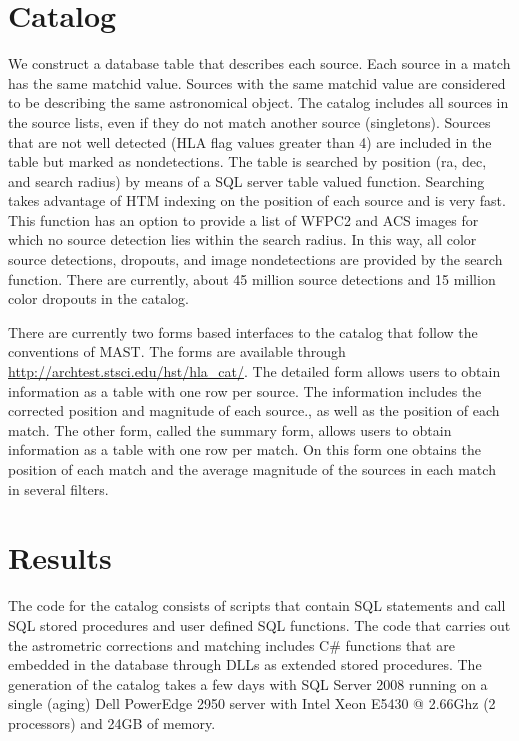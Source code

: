 \section{Catalog}
We construct a database table that describes each source. Each source in a match has the same matchid value.
Sources with the same matchid value are considered to be describing the same astronomical
object. The catalog includes all sources in the source lists, even if they do not match
another source (singletons). Sources that are not well detected (HLA flag values greater than 4)
are included in the table but marked as nondetections. The table is searched by position (ra, dec,
and search radius) by means of
a SQL server table valued function.  Searching takes advantage of HTM indexing
on the position of each source and is very fast.
This function has an option to provide a list of WFPC2 and ACS images for which no source detection
lies within the search radius. In this way, all color source detections, dropouts, and image
nondetections are provided by the search function.  There are currently, about 45 million
source detections and 15 million color dropouts in the catalog.

There are currently two forms based interfaces to the catalog that follow
the conventions of MAST. The forms are available through \url{http://archtest.stsci.edu/hst/hla_cat/}.
The detailed form allows users to obtain information as a table with one row per source.
The information includes the corrected position and magnitude of each source., as well as the position
of each match.
The other form, called the summary form, allows users to obtain information as a table with one row per match.
On this form one obtains the position of each match and the average magnitude of the sources
in each match in several filters.

\section{Results}


The code for the catalog consists  of scripts that contain SQL statements
and call SQL stored procedures and user defined SQL functions.
The code that carries out the astrometric corrections and matching includes  C\# functions that are
embedded in the database through DLLs as extended stored procedures. The generation of the catalog
takes a few days  with SQL Server 2008 running on a single (aging) Dell PowerEdge 2950 server with 
Intel Xeon E5430 @ 2.66Ghz (2 processors) and 24GB of memory.

